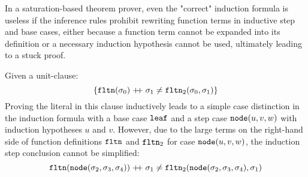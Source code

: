 In a saturation-based theorem prover, even the "correct" induction formula is useless if the inference rules prohibit rewriting function terms in inductive step and base cases, either because a function term cannot be expanded into its definition or a necessary induction hypothesis cannot be used, ultimately leading to a stuck proof.
\begin{example}
	Given a unit-clause:
	$$\{\mathtt{fltn}(\sigma_0)\mathrel{ +\hspace{-1mm}+ }\sigma_1\neq\mathtt{fltn}_2(\sigma_0,\sigma_1)\}$$
	Proving the literal in this clause inductively leads to a simple case distinction in the induction formula with a base case $\mathtt{leaf}$ and a step case $\mathtt{node}(u,v,w)$ with induction hypotheses $u$ and $v$. However, due to the large terms on the right-hand side of function definitions $\mathtt{fltn}$ and $\mathtt{fltn}_2$ for case $\mathtt{node}(u,v,w)$, the induction step conclusion cannot be simplified:
	$$\mathtt{fltn}(\mathtt{node}(\sigma_2,\sigma_3,\sigma_4))\mathrel{ +\hspace{-1mm}+ }\sigma_1\neq\mathtt{fltn}_2(\mathtt{node}(\sigma_2,\sigma_3,\sigma_4),\sigma_1)$$
\end{example}